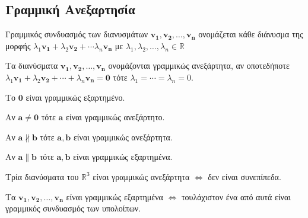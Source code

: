 {  \subsection*{Γραμμική Ανεξαρτησία}
  \begin{myitemize}[leftmargin=*]
    \item \textcolor{Col1}{Γραμμικός συνδυασμός} των διανυσμάτων $ \mathbf{v_{1}},
      \mathbf{v_{2}}, \ldots, \mathbf{v_{n}} $ 
      ονομάζεται κάθε διάνυσμα της μορφής 
      $\lambda_{1} \mathbf{v_{1}}+ \lambda_{2} \mathbf{v_{2}} + \cdots
      \lambda _{n}\mathbf{v_{n}} $ με 
      $ \lambda_{1}, \lambda_{2}, \ldots, \lambda_{n} \in \mathbb{R} $ 
    \item Τα διανύσματα $ \mathbf{v_{1}}, \mathbf{v_{2}}, \ldots, \mathbf{v_{n}} $ 
      ονομάζονται \textcolor{Col1}{γραμμικώς ανεξάρτητα}, αν 
      οποτεδήποτε $\lambda_{1} \mathbf{v_{1}} + \lambda_{2}
      \mathbf{v_{2}} + \cdots + \lambda_{n} \mathbf{v_{n}} \! = \mathbf{0} $ τότε
      $ \lambda_{1} = \cdots = \lambda_{n} \! = 0$. 
    \item Το $ \mathbf{0} $ είναι γραμμικώς εξαρτημένο.
    \item Αν $ \mathbf{a} \neq \mathbf{0} $ τότε $ \mathbf{a}$ 
      είναι γραμμικώς ανεξάρτητο.
    \item Αν $ \mathbf{a} \nparallel \mathbf{b} $ τότε $\mathbf{a}, \mathbf{b} $ 
      είναι γραμμικώς ανεξάρτητα.
    \item Αν $ \mathbf{a} \parallel \mathbf{b} $ τότε $\mathbf{a}, \mathbf{b} $ 
      είναι γραμμικώς εξαρτημένα.
    \item Τρία διανύσματα του $ \mathbb{R}^{3} $ είναι γραμμικώς ανεξάρτητα $
      \Leftrightarrow $ δεν είναι συνεπίπεδα.
    \item Τα $ \mathbf{v_{1}}, \mathbf{v_{2}}, \ldots, \mathbf{v_{n}} $ είναι
      γραμμικώς εξαρτημένα $ \Leftrightarrow $ τουλάχιστον ένα από αυτά είναι γραμμικός 
      συνδυασμός των υπολοίπων.
  \end{myitemize}
}

